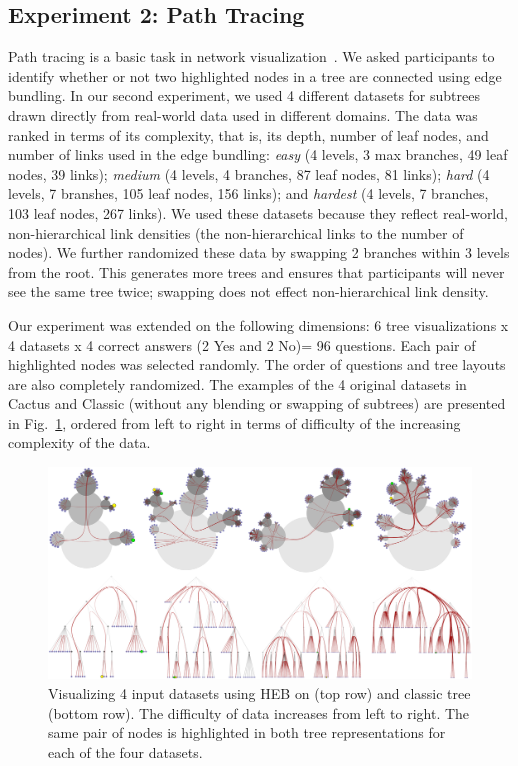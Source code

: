\documentclass[a4paper]{llncs}
\begin{document}
\subsection{Experiment 2: Path Tracing}
Path tracing is a basic task in network visualization~\cite{McGee2012StudyHEB,Purchase1998Effects}. We asked participants to identify whether or not two highlighted nodes in a tree are connected using edge bundling. In our second experiment, we used 4 different datasets for subtrees drawn directly from real-world data used in different domains. The data was ranked in terms of its complexity, that is, its depth, number of leaf nodes, and number of links used in the edge bundling: \textit{easy} (4 levels, 3 max branches, 49 leaf nodes, 39 links); \textit{medium} (4 levels, 4 branches, 87 leaf nodes, 81 links); \textit{hard} (4 levels, 7 branshes, 105 leaf nodes, 156 links); and \textit{hardest} (4 levels, 7 branches, 103 leaf nodes, 267 links). We used these datasets because they reflect real-world, non-hierarchical link densities (the non-hierarchical links to the number of nodes). We further randomized these data by swapping 2 branches within 3 levels from the root. This generates more trees and ensures that participants will never see the same tree twice; swapping does not effect non-hierarchical link density. 

Our experiment was extended on the following dimensions: 6 tree visualizations x 4 datasets x 4 correct answers (2 Yes and 2 No)=  96 questions. Each pair of highlighted nodes was selected randomly. The order of questions and tree layouts are also completely randomized. The examples of the 4 original datasets in Cactus and Classic (without any blending or swapping of subtrees) are presented in Fig.~\ref{fig:Study2}, ordered from left to right in terms of difficulty of the increasing complexity of the data.

\begin{figure}[htb]
 \centering
 \includegraphics[width=\textwidth]{figures/Study2.png}
 \caption{\label{fig:Study2} Visualizing 4 input datasets using HEB on \theName{} (top row) and classic tree (bottom row). The difficulty of data increases from left to right. The same pair of nodes is highlighted in both tree representations for each of the four datasets.}
\end{figure}
\end{document}
